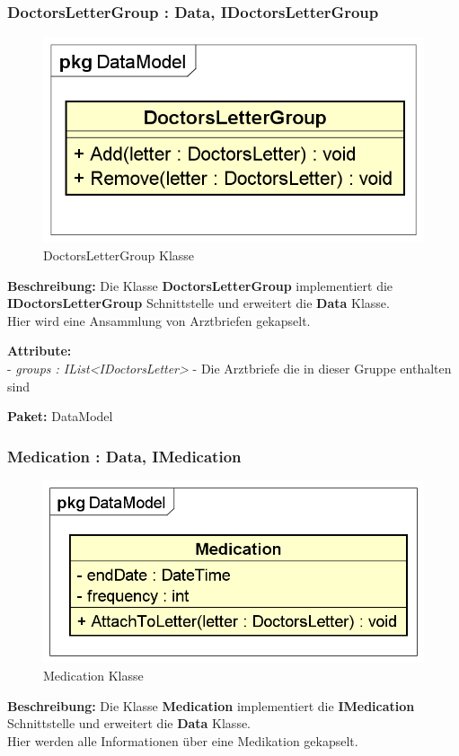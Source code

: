 \documentclass[a4paper]{scrreprt}
\begin{document}
\subsubsection{DoctorsLetterGroup : Data, IDoctorsLetterGroup}
\begin{figure}[H]
\centering
\includegraphics[width=0.75\textheight]{graphics/Klassendiagramme/Model/DoctorsLetterGroup.png}
\caption{DoctorsLetterGroup Klasse}
\end{figure}
\textbf{Beschreibung:} Die Klasse \textbf{DoctorsLetterGroup} implementiert die \textbf{IDoctorsLetterGroup} Schnittstelle und erweitert die \textbf{Data} Klasse.\\
Hier wird eine Ansammlung von Arztbriefen gekapselt.

\textbf{Attribute:}\\
- \textit{groups : IList<IDoctorsLetter>} - Die Arztbriefe die in dieser Gruppe enthalten sind

\textbf{Paket:} DataModel

\subsubsection{Medication : Data, IMedication}
\begin{figure}[H]
\centering
\includegraphics[width=0.75\textheight]{graphics/Klassendiagramme/Model/Medication.png}
\caption{Medication Klasse}
\end{figure}
\textbf{Beschreibung:} Die Klasse \textbf{Medication} implementiert die \textbf{IMedication} Schnittstelle und erweitert die \textbf{Data} Klasse.\\
Hier werden alle Informationen über eine Medikation gekapselt.
\end{document}

